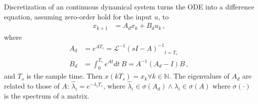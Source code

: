 \documentclass[runningheads,a4paper]{llncs}
\begin{document}
Discretization of an continuous dynamical system turns the ODE into a
difference equation, assuming zero-order hold for the input $u$,
%
to
\begin{align}
\label{eq:discretization}
x_{k+1} &= A_d x_k+B_d u_k \,,
\end{align}
where
\begin{align}
\label{eq:discretize}
A_d &= e^{A T_s} = \mathcal{L}^{-1} { ( s I - A )^{-1} }_{t = T_s}\\
B_d &= \int_{0}^{T_s} e^{A t} dt\ B = A^{-1} ( A_d - I ) B \,,
\end{align}
%
and $T_s$ is the sample time. Then
$x(kT_s)=x_k 
\forall k \in \mathbb N$.
The eigenvalues of $A_d$ 
are related to those of $A$:  
%
$\hat{\lambda}_i=e^{-\lambda_iT_s}$, where $\hat{\lambda}_i \in \sigma(A_d)
\wedge \lambda_i \in \sigma(A)$ where $\sigma(\cdot)$ is the spectrum of a
matrix.

\end{document}
